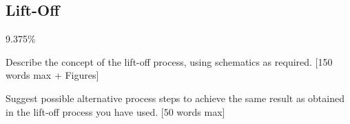 \subsection{Lift-Off}
\label{sec:fab:liftoff}

9.375\%

Describe the concept of the lift-off process, using schematics as required. [150 words max + Figures]

Suggest possible alternative process steps to achieve the same result as obtained in the lift-off process you have used. [50 words max]
